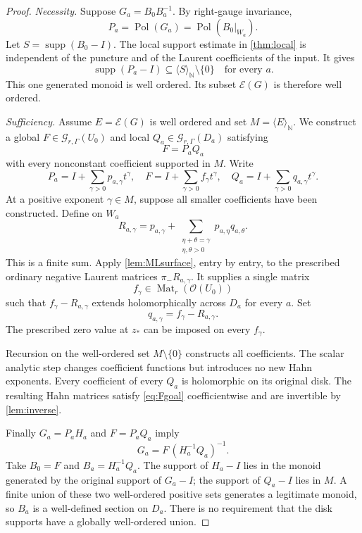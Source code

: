 \documentclass[11pt,letterpaper]{article}
\theoremstyle{definition}
\theoremstyle{remark}
\newcommand{\N}{\mathbb N}
\newcommand{\OO}{\mathcal O}
\newcommand{\GG}{\mathscr G_{r,\Gamma}}
\newcommand{\Mat}{\operatorname{Mat}}
\newcommand{\supp}{\operatorname{supp}}
\newcommand{\Pol}{\operatorname{Pol}}
\newcommand{\EU}{\mathcal E}
\newcommand{\angles}[1]{\langle #1\rangle_{\N}}
\numberwithin{equation}{section}
\begin{document}
\begin{proof}
\emph{Necessity.} Suppose $G_a=B_0B_a^{-1}$. By right-gauge invariance,
\[
 P_a=\Pol(G_a)=\Pol(B_0|_{W_a}).
\]
Let $S=\supp(B_0-I)$. The local support estimate in \cref{thm:local} is independent of the puncture and of the Laurent coefficients of the input. It gives
\[
 \supp(P_a-I)\subseteq\angles S\setminus\{0\}
 \quad\text{for every }a.
\]
This one generated monoid is well ordered. Its subset $\EU(G)$ is therefore well ordered.

\emph{Sufficiency.} Assume $E=\EU(G)$ is well ordered and set $M=\angles E$. We construct a global $F\in\GG(U_0)$ and local $Q_a\in\GG(D_a)$ satisfying
\begin{equation}\label{eq:Fgoal}
 F=P_aQ_a
\end{equation}
with every nonconstant coefficient supported in $M$. Write
\[
 P_a=I+\sum_{\gamma>0}p_{a,\gamma}t^\gamma,
 \quad F=I+\sum_{\gamma>0}f_\gamma t^\gamma,
 \quad Q_a=I+\sum_{\gamma>0}q_{a,\gamma}t^\gamma.
\]
At a positive exponent $\gamma\in M$, suppose all smaller coefficients have been constructed. Define on $W_a$
\begin{equation}\label{eq:globalrecursion}
 R_{a,\gamma}
 =p_{a,\gamma}+
   \sum_{\substack{\eta+\theta=\gamma\\\eta,\theta>0}}
      p_{a,\eta}q_{a,\theta}.
\end{equation}
This is a finite sum. Apply \cref{lem:MLsurface}, entry by entry, to the prescribed ordinary negative Laurent matrices $\pi_-R_{a,\gamma}$. It supplies a single matrix
\[
 f_\gamma\in\Mat_r(\OO(U_0))
\]
such that $f_\gamma-R_{a,\gamma}$ extends holomorphically across $D_a$ for every $a$. Set
\begin{equation}\label{eq:qrecursion}
 q_{a,\gamma}=f_\gamma-R_{a,\gamma}.
\end{equation}
The prescribed zero value at $z_*$ can be imposed on every $f_\gamma$.

Recursion on the well-ordered set $M\setminus\{0\}$ constructs all coefficients. The scalar analytic step changes coefficient functions but introduces no new Hahn exponents. Every coefficient of every $Q_a$ is holomorphic on its original disk. The resulting Hahn matrices satisfy \eqref{eq:Fgoal} coefficientwise and are invertible by \cref{lem:inverse}.

Finally $G_a=P_aH_a$ and $F=P_aQ_a$ imply
\[
 G_a=F\,(H_a^{-1}Q_a)^{-1}.
\]
Take $B_0=F$ and $B_a=H_a^{-1}Q_a$. The support of $H_a-I$ lies in the monoid generated by the original support of $G_a-I$; the support of $Q_a-I$ lies in $M$. A finite union of these two well-ordered positive sets generates a legitimate monoid, so $B_a$ is a well-defined section on $D_a$. There is no requirement that the disk supports have a globally well-ordered union.
\end{proof}
\end{document}
